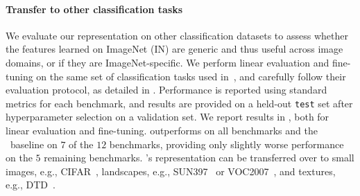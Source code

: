 \begin{table}[h]
         
\caption{\label{table:few_labels}Semi-supervised training with a fraction of ImageNet labels.}


\vspace{-0.8em}
\end{table}


\paragraph{Transfer to other classification tasks} We evaluate our representation on other classification datasets to assess whether the features learned on ImageNet (IN) are generic and thus useful across image domains, or if they are ImageNet-specific.
We perform linear evaluation and fine-tuning on the same set of classification tasks used in~\cite{SimCLR,kornblith2019better}, and carefully follow their evaluation protocol, as detailed in . Performance is reported using standard metrics for each benchmark, and results are provided on a held-out \texttt{test\xspace} set after hyperparameter selection on a validation set. We report results in , both for linear evaluation and fine-tuning. \algo outperforms \simclr on all benchmarks and the \supervisedbaseline~baseline on $7$ of the $12$ benchmarks, providing only slightly worse performance on the $5$ remaining benchmarks. \algo's representation can be transferred over to small images, e.g., CIFAR~\cite{cifar}, landscapes, e.g., SUN397~\cite{sun397} or VOC2007~\cite{pascal}, and textures, e.g., DTD~\cite{dtd}.

